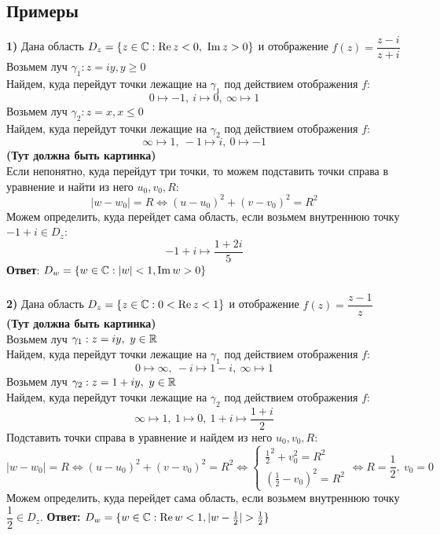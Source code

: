 	\subsection{Примеры}
	\noindent
	\textbf{1)} Дана область $D_z = \{ z \in \mathbb{C} : \operatorname{Re} z < 0,\ \operatorname{Im} z > 0 \}$ и отображение $ f(z) = \dfrac{z - i}{z + i} $\\
	Возьмем луч $ \gamma_1 : z = iy, y \geqslant 0 $\\ 
	Найдем, куда перейдут точки лежащие на $ \gamma_1 $ под действием отображения $ f $:
	\[ 0 \mapsto -1, \ i \mapsto 0, \ \infty \mapsto 1\]
	Возьмем луч $ \gamma_2 : z = x, x \leqslant 0\ $\\
	Найдем, куда перейдут точки лежащие на $ \gamma_2 $ под действием отображения $ f $:
		\[ \infty \mapsto 1, \ -1 \mapsto i,\ 0 \mapsto -1 \]
	\textbf{(Тут должна быть картинка)}\\
	Если непонятно, куда перейдут три точки, то можем подставить точки справа в уравнение и найти из него $ u_0, v_0, R $:
		\[|w - w_0| = R \iff (u - u_0)^2 + (v - v_0)^2 = R^2\]
	Можем определить, куда перейдет сама область, если возьмем внутреннюю точку $-1 + i \in D_z$: 
		\[ -1 + i \mapsto \frac{1+2i}{5} \]
	\textbf{Ответ}: $D_w = \{w \in \mathbb{C} : |w| < 1, \operatorname{Im} w > 0\}$\\ \ \\
	\noindent
	\textbf{2)} Дана область $D_z = \{ z \in \mathbb{C} : 0 < \operatorname{Re} z < 1\}$ и отображение $ f(z) = \dfrac{z - 1}{z}$\\
	\textbf{(Тут должна быть картинка)}\\
	Возьмем луч $ \gamma_1 : z = iy, \ y \in \mathbb{R} $\\
	Найдем, куда перейдут точки лежащие на $ \gamma_1 $ под действием отображения $ f $:
	\[ 0 \mapsto \infty,\ -i \mapsto 1-i, \ \infty \mapsto 1\]
	Возьмем луч $ \gamma_2 : z = 1 + iy, \ y \in \mathbb{R} $\\
	Найдем, куда перейдут точки лежащие на $ \gamma_2 $ под действием отображения $ f $:
	\[ \infty \mapsto 1,\ 1 \mapsto 0,\ 1+i \mapsto \frac{1 + i}{2} \]
	Подставить точки справа в уравнение и найдем из него $ u_0, v_0, R $:
	\[|w - w_0| = R \iff (u - u_0)^2 + (v - v_0)^2 = R^2 \iff 
	\begin{cases}
		\frac{1}{2}^2 + v_0^2 = R^2 \\
		(\frac{1}{2} - v_0)^2 = R^2
	\end{cases} \iff R = \frac{1}{2}, \ v_0 = 0 \]
	Можем определить, куда перейдет сама область, если возьмем внутреннюю точку $\dfrac{1}{2} \in D_z$.
	\textbf{Ответ:} $ D_w = \{ w \in \mathbb{C} : \operatorname{Re} w < 1, |w - \frac{1}{2}| > \frac{1}{2}\}$
